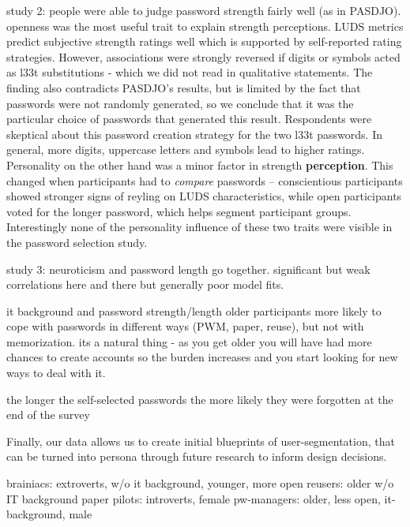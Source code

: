 study 2: 
people were able to judge password strength fairly well (as in PASDJO). openness was the most useful trait to explain strength perceptions. LUDS metrics predict subjective strength ratings well which is supported by self-reported rating strategies. However, associations were strongly reversed if digits or symbols acted as l33t substitutions - which we did not read in qualitative statements. The finding also contradicts PASDJO's results, but is limited by the fact that passwords were not randomly generated, so we conclude that it was the particular choice of passwords that generated this result. Respondents were skeptical about this password creation strategy for the two l33t passwords. In general, more digits, uppercase letters and symbols lead to higher ratings. Personality on the other hand was a minor factor in strength \textbf{perception}. This changed when participants had to \textit{compare} passwords -- conscientious participants showed stronger signs of reyling on LUDS characteristics, while open participants voted for the longer password, which helps segment participant groups. 
Interestingly none of the personality influence of these two traits were visible in the password selection study.

study 3:
neuroticism and password length go together. significant but weak correlations here and there but generally poor model fits. 

it background and password strength/length 
older participants more likely to cope with passwords in different ways (PWM, paper, reuse), but not with memorization. its a natural thing - as you get older you will have had more chances to create accounts so the burden increases and you start looking for new ways to deal with it. 

the longer the self-selected passwords the more likely they were forgotten at the end of the survey


Finally, our data allows us to create initial blueprints of user-segmentation, that can be turned into \gls{persona} through future research to inform design decisions.

brainiacs: extroverts,  w/o it background, younger, more open
reusers: older w/o IT background
paper pilots: introverts, female
pw-managers: older, less open, it-background, male

